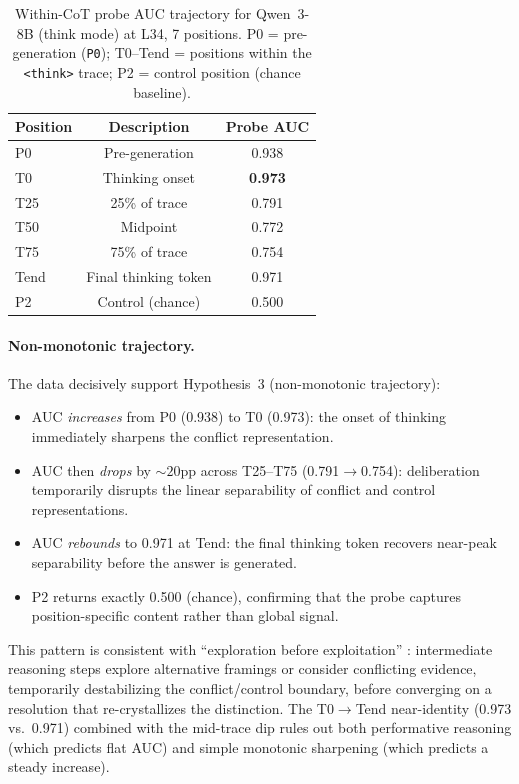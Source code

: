 \documentclass{article}
\newcommand{\pzero}{\texttt{P0}}
\begin{document}
\begin{table}[ht]
\centering
\caption{Within-CoT probe AUC trajectory for Qwen~3-8B (think mode)
  at L34, 7 positions.  P0 = pre-generation (\pzero{}); T0--Tend =
  positions within the \texttt{<think>} trace; P2 = control position
  (chance baseline).}
\label{tab:within_cot_qwen}
\vspace{4pt}
\small
\begin{tabular}{lcc}
\toprule
\textbf{Position} & \textbf{Description} & \textbf{Probe AUC} \\
\midrule
P0   & Pre-generation          & 0.938 \\
T0   & Thinking onset          & \textbf{0.973} \\
T25  & 25\% of trace           & 0.791 \\
T50  & Midpoint                & 0.772 \\
T75  & 75\% of trace           & 0.754 \\
Tend & Final thinking token    & 0.971 \\
P2   & Control (chance)        & 0.500 \\
\bottomrule
\end{tabular}
\end{table}

\paragraph{Non-monotonic trajectory.}
The data decisively support Hypothesis~3 (non-monotonic trajectory):
\begin{itemize}[leftmargin=*,itemsep=2pt]
  \item AUC \emph{increases} from P0 (0.938) to T0 (0.973): the
  onset of thinking immediately sharpens the conflict representation.
  \item AUC then \emph{drops} by ${\sim}20$pp across T25--T75
  (0.791$\to$0.754): deliberation temporarily disrupts the linear
  separability of conflict and control representations.
  \item AUC \emph{rebounds} to 0.971 at Tend: the final thinking
  token recovers near-peak separability before the answer is generated.
  \item P2 returns exactly 0.500 (chance), confirming that the probe
  captures position-specific content rather than global signal.
\end{itemize}

\noindent This pattern is consistent with ``exploration before
exploitation'' \citep{boppana2026reasoning}: intermediate reasoning
steps explore alternative framings or consider conflicting evidence,
temporarily destabilizing the conflict/control boundary, before
converging on a resolution that re-crystallizes the distinction.
The T0$\to$Tend near-identity (0.973 vs.\ 0.971) combined with the
mid-trace dip rules out both performative reasoning (which predicts
flat AUC) and simple monotonic sharpening (which predicts a steady
increase).
\end{document}
